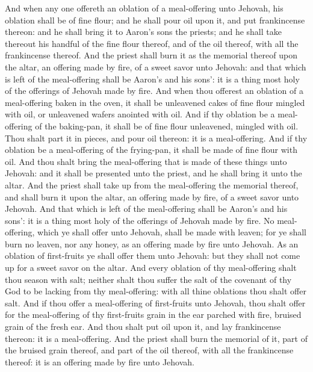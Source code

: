 And when any one offereth an oblation of a meal-offering unto Jehovah, his oblation shall be of fine flour; and he shall pour oil upon it, and put frankincense thereon: and he shall bring it to Aaron’s sons the priests; and he shall take thereout his handful of the fine flour thereof, and of the oil thereof, with all the frankincense thereof. And the priest shall burn it as the memorial thereof upon the altar, an offering made by fire, of a sweet savor unto Jehovah: and that which is left of the meal-offering shall be Aaron’s and his sons’: it is a thing most holy of the offerings of Jehovah made by fire.  And when thou offerest an oblation of a meal-offering baken in the oven, it shall be unleavened cakes of fine flour mingled with oil, or unleavened wafers anointed with oil. And if thy oblation be a meal-offering of the baking-pan, it shall be of fine flour unleavened, mingled with oil. Thou shalt part it in pieces, and pour oil thereon: it is a meal-offering. And if thy oblation be a meal-offering of the frying-pan, it shall be made of fine flour with oil. And thou shalt bring the meal-offering that is made of these things unto Jehovah: and it shall be presented unto the priest, and he shall bring it unto the altar. And the priest shall take up from the meal-offering the memorial thereof, and shall burn it upon the altar, an offering made by fire, of a sweet savor unto Jehovah. And that which is left of the meal-offering shall be Aaron’s and his sons’: it is a thing most holy of the offerings of Jehovah made by fire.  No meal-offering, which ye shall offer unto Jehovah, shall be made with leaven; for ye shall burn no leaven, nor any honey, as an offering made by fire unto Jehovah. As an oblation of first-fruits ye shall offer them unto Jehovah: but they shall not come up for a sweet savor on the altar. And every oblation of thy meal-offering shalt thou season with salt; neither shalt thou suffer the salt of the covenant of thy God to be lacking from thy meal-offering: with all thine oblations thou shalt offer salt.  And if thou offer a meal-offering of first-fruits unto Jehovah, thou shalt offer for the meal-offering of thy first-fruits grain in the ear parched with fire, bruised grain of the fresh ear. And thou shalt put oil upon it, and lay frankincense thereon: it is a meal-offering. And the priest shall burn the memorial of it, part of the bruised grain thereof, and part of the oil thereof, with all the frankincense thereof: it is an offering made by fire unto Jehovah. 

